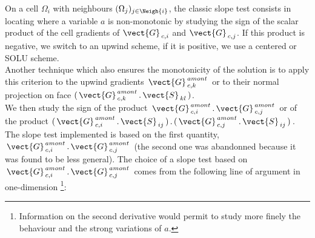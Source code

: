 On a cell $\Omega_i$ with neighbours $(\Omega_j)_{j\in \Neigh{i}}$, the classic slope test
consists in locating where a variable $a$ is non-monotonic by studying the sign of
the scalar product of the cell gradients of $\vect{G}_{\,c,i}$
and $\vect{G}_{\,c,j}$. If this product is negative, we switch to an upwind scheme, if it is
positive, we use a centered or SOLU scheme.\\
Another technique which also ensures the monotonicity of the solution is
to apply this criterion to the upwind gradients
$\,\vect{G}^{\,amont}_{\,c,k}\,$ or to their normal projection on
face $(\,\vect{G}^{\,amont}_{\,c,k}\,.\,\vect{S}_{\,kl}\,)$.\\
We then study the sign of the product
$\,\vect{G}^{\,amont}_{\,c,i}\,.\,\vect{G}^{\,amont}_{\,c,j}\,$ or of the product
$(\,\vect{G}^{\,amont}_{\,c,i}\,.\,\vect{S}_{\,ij}\,)\,.\,(\,\vect{G}^{\,amont}_{\,c,j}\,.\,\vect{S}_{\,ij}\,)\,$.
The slope test implemented is based on the first quantity,
$\,\vect{G}^{\,amont}_{\,c,i}\,.\,\vect{G}^{\,amont}_{\,c,j}\,$
(the second one was abandonned because it was found to be less general). The
choice of a slope test based on
$\,\vect{G}^{\,amont}_{\,c,i}\,.\,\vect{G}^{\,amont}_{\,c,j}\,$
comes from the following line of argument in one-dimension \footnote{Information
on the second derivative would permit to study more finely the behaviour and the strong
variations of $a$.}:

